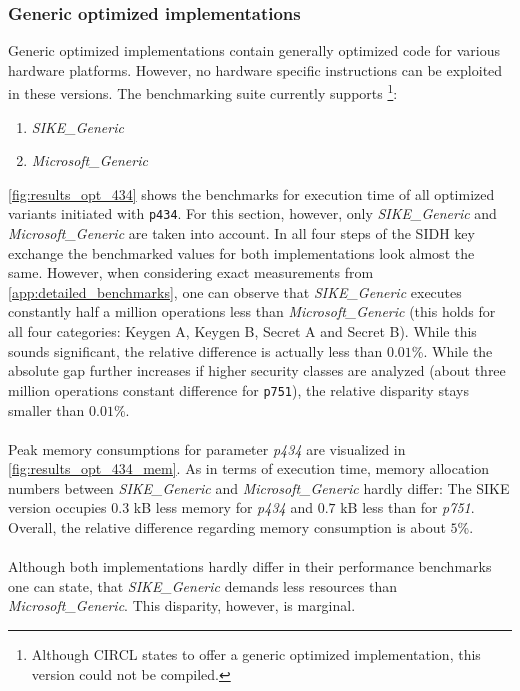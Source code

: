 \subsubsection{Generic optimized implementations}\label{sec:analysis_generic}
Generic optimized implementations contain generally optimized code for various hardware platforms. However, no hardware specific instructions can be exploited in these versions. The benchmarking suite currently supports \footnote{Although CIRCL states to offer a generic optimized implementation\parencite{circl2020github}, this version could not be compiled.}:
\begin{enumerate}
\item \textit{SIKE\_Generic}
\item \textit{Microsoft\_Generic}
\end{enumerate}
\autoref{fig:results_opt_434} shows the benchmarks for execution time of all optimized variants initiated with \texttt{p434}. For this section, however, only \textit{SIKE\_Generic} and \textit{Microsoft\_Generic} are taken into account. In all four steps of the SIDH key exchange the benchmarked values for both implementations look almost the same. However, when considering exact measurements from  \ref{app:detailed_benchmarks}, one can observe that \textit{SIKE\_Generic} executes constantly half a million operations less than \textit{Microsoft\_Generic} (this holds for all four categories: Keygen A, Keygen B, Secret A and Secret B). While this sounds significant, the relative difference is actually less than $0.01$\%. While the absolute gap further increases if higher security classes are analyzed (about three million operations constant difference for \texttt{p751}), the relative disparity stays smaller than $0.01$\%.
\\\\
Peak memory consumptions for parameter \textit{p434} are visualized in  \autoref{fig:results_opt_434_mem}. As in terms of execution time, memory allocation numbers between \textit{SIKE\_Generic} and \textit{Microsoft\_Generic} hardly differ: The SIKE version occupies $0.3$ kB less memory for \textit{p434} and $0.7$ kB less than for \textit{p751}. Overall, the relative difference regarding memory consumption is about $5$\%.
\\\\
Although both implementations hardly differ in their performance benchmarks one can state, that \textit{SIKE\_Generic} demands less resources than \textit{Microsoft\_Generic}. This disparity, however, is marginal.

